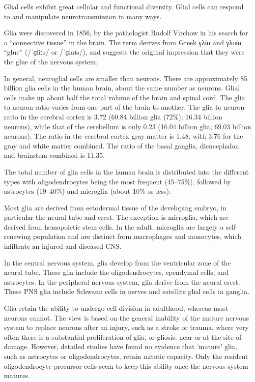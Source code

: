 Glial cells exhibit great cellular and functional diversity. Glial cells can respond to and manipulate neurotransmission in many ways.

Glia were discovered in 1856, by the pathologist Rudolf Virchow in his search for a ``connective tissue'' in the brain. The term derives from Greek γλία and γλοία ``glue'' (/ˈɡliːə/ or /ˈɡlaɪə/), and suggests the original impression that they were the glue of the nervous system.

In general, neuroglial cells are smaller than neurons. There are approximately 85 billion glia cells in the human brain, about the same number as neurons. Glial cells make up about half the total volume of the brain and spinal cord. The glia to neuron-ratio varies from one part of the brain to another. The glia to neuron-ratio in the cerebral cortex is 3.72 (60.84 billion glia (72\%); 16.34 billion neurons), while that of the cerebellum is only 0.23 (16.04 billion glia; 69.03 billion neurons). The ratio in the cerebral cortex gray matter is 1.48, with 3.76 for the gray and white matter combined. The ratio of the basal ganglia, diencephalon and brainstem combined is 11.35.

The total number of glia cells in the human brain is distributed into the different types with oligodendrocytes being the most frequent (45--75\%), followed by astrocytes (19--40\%) and microglia (about 10\% or less).

Most glia are derived from ectodermal tissue of the developing embryo, in particular the neural tube and crest. The exception is microglia, which are derived from hemopoietic stem cells. In the adult, microglia are largely a self-renewing population and are distinct from macrophages and monocytes, which infiltrate an injured and diseased CNS.

In the central nervous system, glia develop from the ventricular zone of the neural tube. These glia include the oligodendrocytes, ependymal cells, and astrocytes. In the peripheral nervous system, glia derive from the neural crest. These PNS glia include Schwann cells in nerves and satellite glial cells in ganglia.

Glia retain the ability to undergo cell division in adulthood, whereas most neurons cannot. The view is based on the general inability of the mature nervous system to replace neurons after an injury, such as a stroke or trauma, where very often there is a substantial proliferation of glia, or gliosis, near or at the site of damage. However, detailed studies have found no evidence that `mature' glia, such as astrocytes or oligodendrocytes, retain mitotic capacity. Only the resident oligodendrocyte precursor cells seem to keep this ability once the nervous system matures.

